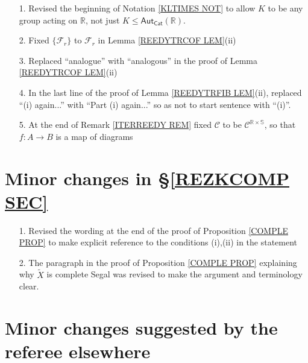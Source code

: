 \documentclass{article}
\begin{document}
\begin{itemize}
	
\item[1.] Revised the beginning of Notation \ref{KLTIMES NOT}
to allow $K$ to be any group acting on $\mathbb{R}$,
not just $K \leq \mathsf{Aut}_{\mathsf{Cat}}(\mathbb{R})$. 	

\item[2.] Fixed $\{\mathcal{F}_r\}$
to $\mathcal{F}_r$ in Lemma \ref{REEDYTRCOF LEM}(ii)
     
\item[3.] Replaced ``analogue'' with ``analogous'' in the proof of Lemma \ref{REEDYTRCOF LEM}(ii)

\item[4.]
In the last line of the proof of Lemma \ref{REEDYTRFIB LEM}(ii),
replaced ``(i) again...'' with ``Part (i) again...''
so as not to start sentence with ``(i)''.

\item[5.]
At the end of Remark \ref{ITERREEDY REM}
fixed $\mathcal{C}$
to be $\mathcal{C}^{\mathbb{R} \times \mathbb{S}}$,
so that $f\colon A \to B$ is a map of diagrams
\end{itemize}








\section{Minor changes in \S \ref{REZKCOMP SEC}}
 

\begin{itemize}
	\item[1.]
	Revised the wording at the end of the proof of 
	Proposition \ref{COMPLE PROP}
	to make explicit reference to the conditions (i),(ii)
	in the statement
	\item[2.]
	The paragraph in the proof of Proposition \ref{COMPLE PROP}
	explaining why $\widetilde{X}$
	is complete Segal was revised to make the argument and terminology clear.
\end{itemize}



\section{Minor changes suggested by the referee elsewhere}
\end{document}
